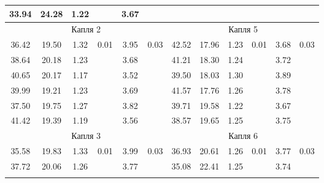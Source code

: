 \documentclass[14pt, a4paper,reqno]{article}
\begin{document}
\begin{table}[h]
\begin{tabular}{|c|c|c|c|c|c|c|c|c|c|c|c|}
        33.94   & 24.28   & 1.22    &                       & 3.67 &                       &         &         &         &                       &       &                      \\ \hline
        \multicolumn{6}{|c|}{Капля 2}                                                      & \multicolumn{6}{|c|}{Капля 5}                                                      \\ \hline       
        36.42   & 19.50   & 1.32    & \multirow{6}{*}{0.01} & 3.95 & \multirow{6}{*}{0.03} & 42.52   & 17.96   & 1.23    & \multirow{6}{*}{0.01} & 3.68 & \multirow{6}{*}{0.03} \\ \hhline{---~-~---~-~}
        38.64   & 20.18   & 1.23    &                       & 3.68 &                       & 41.21   & 18.30   & 1.24    &                       & 3.72 &                       \\ \hhline{---~-~---~-~}
        40.65   & 20.17   & 1.17    &                       & 3.52 &                       & 39.50   & 18.03   & 1.30    &                       & 3.89 &                       \\ \hhline{---~-~---~-~}
        39.99   & 19.21   & 1.23    &                       & 3.69 &                       & 41.57   & 17.76   & 1.26    &                       & 3.78 &                       \\ \hhline{---~-~---~-~}
        37.50   & 19.75   & 1.27    &                       & 3.82 &                       & 39.71   & 19.58   & 1.22    &                       & 3.67 &                       \\ \hhline{---~-~---~-~}
        41.42   & 19.39   & 1.19    &                       & 3.56 &                       & 38.57   & 19.65   & 1.25    &                       & 3.75 &                       \\ \hline       
        \multicolumn{6}{|c|}{Капля 3}                                                      & \multicolumn{6}{|c|}{Капля 6}                                                      \\ \hline       
        35.58   & 19.83   & 1.33    & \multirow{6}{*}{0.01} & 3.99 & \multirow{6}{*}{0.03} & 36.93   & 20.61   & 1.26    & \multirow{6}{*}{0.01} & 3.77 & \multirow{6}{*}{0.03} \\ \hhline{---~-~---~-~}
        37.72   & 20.06   & 1.26    &                       & 3.77 &                       & 35.08   & 22.41   & 1.25    &                       & 3.74 &                       \\ \hhline{---~-~---~-~}

\end{tabular}
\end{table}
\end{document}
